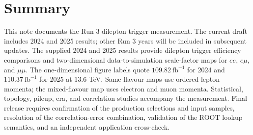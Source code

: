 \section{Summary}
This note documents the Run 3 dilepton trigger measurement. The current draft includes 2024 and 2025 results; other Run 3 years will be included in subsequent updates. The supplied 2024 and 2025 results provide dilepton trigger efficiency comparisons and two-dimensional data-to-simulation scale-factor maps for $ee$, $e\mu$, and $\mu\mu$. The one-dimensional figure labels quote $109.82~\mathrm{fb}^{-1}$ for 2024 and $110.37~\mathrm{fb}^{-1}$ for 2025 at 13.6 TeV. Same-flavour maps use ordered lepton momenta; the mixed-flavour map uses electron and muon momenta. Statistical, topology, pileup, era, and correlation studies accompany the measurement. Final release requires confirmation of the production selections and input samples, resolution of the correlation-error combination, validation of the ROOT lookup semantics, and an independent application cross-check.
